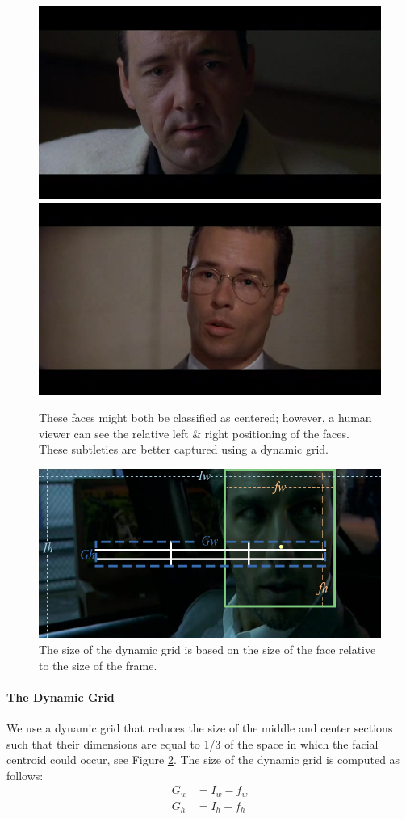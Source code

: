  \begin{figure}[tb]
\begin{center}
\includegraphics[width=0.49\linewidth]
    {fig/slightLeft.jpg}
\includegraphics[width=0.49\linewidth]
    {fig/slightRight.jpg}
\end{center}
\caption{These faces might both be classified as centered; however, a human viewer can see the relative left \& right positioning of the faces. These subtleties are better captured using a dynamic grid.}
\label{fig:leftRight}
\end{figure}

\begin{figure}[tb]
\begin{center}
\includegraphics[width=0.98\linewidth]
    {fig/dyGrid.jpg}
\end{center}
\caption{The size of the dynamic grid is based on the size of the face relative to the size of the frame.}
\label{fig:dyGrid}
\end{figure}

\paragraph{The Dynamic Grid}
We use a dynamic grid that  reduces the size of the middle and center sections such that their dimensions are equal to 1/3 of the space in which the facial centroid could occur, see Figure \ref{fig:dyGrid}. The size of the dynamic grid is computed as follows: 
\begin{eqnarray}
  G_{w} &= I_{w} - f_{w} \\
  G_{h} &= I_{h} - f_{h}
\end{eqnarray}

